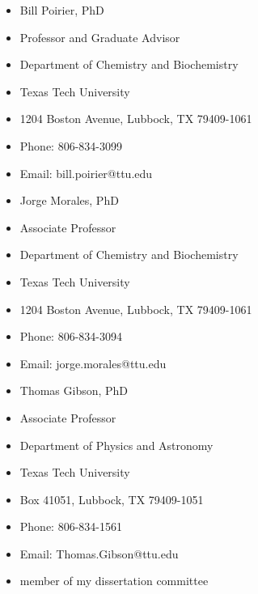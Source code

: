 \documentclass[
]{article}
\providecommand{\tightlist}{%
  \setlength{\itemsep}{0pt}\setlength{\parskip}{0pt}}
\begin{document}
\begin{itemize}
\tightlist
\item
  Bill Poirier, PhD
\item
  Professor and Graduate Advisor
\item
  Department of Chemistry and Biochemistry
\item
  Texas Tech University
\item
  1204 Boston Avenue, Lubbock, TX 79409-1061
\item
  Phone: 806-834-3099
\item
  Email: bill.poirier@ttu.edu
\end{itemize}

\begin{itemize}
\tightlist
\item
  Jorge Morales, PhD
\item
  Associate Professor
\item
  Department of Chemistry and Biochemistry
\item
  Texas Tech University
\item
  1204 Boston Avenue, Lubbock, TX 79409-1061
\item
  Phone: 806-834-3094
\item
  Email: jorge.morales@ttu.edu
\end{itemize}

\begin{itemize}
\tightlist
\item
  Thomas Gibson, PhD
\item
  Associate Professor
\item
  Department of Physics and Astronomy
\item
  Texas Tech University
\item
  Box 41051, Lubbock, TX 79409-1051
\item
  Phone: 806-834-1561
\item
  Email: Thomas.Gibson@ttu.edu
\item
  member of my dissertation committee
\end{itemize}
\end{document}
